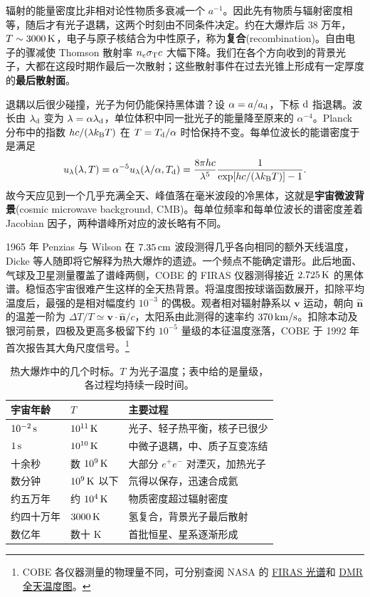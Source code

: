 辐射的能量密度比非相对论性物质多衰减一个 $a^{-1}$。因此先有物质与辐射密度相等，随后才有光子退耦，这两个时刻由不同条件决定。约在大爆炸后 $38$ 万年，$T\sim3000\,{\rm K}$，电子与原子核结合为中性原子，称为\textbf{复合}(recombination)。自由电子的骤减使 Thomson 散射率 $n_e\sigma_{\rm T}c$ 大幅下降。我们在各个方向收到的背景光子，大都在这段时期作最后一次散射；这些散射事件在过去光锥上形成有一定厚度的\textbf{最后散射面}。

退耦以后很少碰撞，光子为何仍能保持黑体谱？设 $\alpha=a/a_{\rm d}$，下标 $\rm d$ 指退耦。波长由 $\lambda_{\rm d}$ 变为 $\lambda=\alpha\lambda_{\rm d}$，单位体积中同一批光子的能量降至原来的 $\alpha^{-4}$。Planck 分布中的指数 $hc/(\lambda k_{\rm B}T)$ 在 $T=T_{\rm d}/\alpha$ 时恰保持不变。每单位波长的能谱密度于是满足
\[
   u_\lambda(\lambda,T)=\alpha^{-5}u_\lambda(\lambda/\alpha,T_{\rm d})
   =\frac{8\pi hc}{\lambda^5}\frac{1}{\exp[hc/(\lambda k_{\rm B}T)]-1}.
\]
故今天应见到一个几乎充满全天、峰值落在毫米波段的冷黑体，这就是\textbf{宇宙微波背景}(cosmic microwave background, CMB)。每单位频率和每单位波长的谱密度差着 Jacobian 因子，两种谱峰所对应的波长略有不同。

1965 年 Penzias 与 Wilson 在 $7.35\,{\rm cm}$ 波段测得几乎各向相同的额外天线温度，Dicke 等人随即将它解释为热大爆炸的遗迹。一个频点不能确定谱形。此后地面、气球及卫星测量覆盖了谱峰两侧，COBE 的 FIRAS 仪器测得接近 $2.725\,{\rm K}$ 的黑体谱。稳恒态宇宙很难产生这样的全天热背景。将温度图按球谐函数展开，扣除平均温度后，最强的是相对幅度约 $10^{-3}$ 的偶极。观者相对辐射静系以 $\bm v$ 运动，朝向 $\hat{\bm n}$ 的温差一阶为 $\Delta T/T\simeq\bm v\cdot\hat{\bm n}/c$，太阳系由此测得的速率约 $370\,{\rm km/s}$。扣除本动及银河前景，四极及更高多极留下约 $10^{-5}$ 量级的本征温度涨落，COBE 于 1992 年首次报告其大角尺度信号。\footnote{COBE 各仪器测量的物理量不同，可分别查阅 NASA 的 \href{https://lambda.gsfc.nasa.gov/product/cobe/about_firas.html}{FIRAS 光谱}和 \href{https://lambda.gsfc.nasa.gov/product/cobe/about_dmr.html}{DMR 全天温度图}。}

\begin{table}[htbp]
\centering\small
\caption{热大爆炸中的几个时标。$T$ 为光子温度；表中给的是量级，各过程均持续一段时间。}\label{tab:cosmo-thermal}
\begin{tabular}{@{}lll@{}}\toprule
宇宙年龄 & $T$ & 主要过程 \\ \midrule
$10^{-2}\,{\rm s}$ & $10^{11}\,{\rm K}$ & 光子、轻子热平衡，核子已很少 \\
$1\,{\rm s}$ & $10^{10}\,{\rm K}$ & 中微子退耦，中、质子互变冻结 \\
十余秒 & 数 $10^9\,{\rm K}$ & 大部分 $e^+e^-$ 对湮灭，加热光子 \\
数分钟 & $10^9\,{\rm K}$ 以下 & 氘得以保存，迅速合成氦 \\
约五万年 & 约 $10^4\,{\rm K}$ & 物质密度超过辐射密度 \\
约四十万年 & $3000\,{\rm K}$ & 氢复合，背景光子最后散射 \\
数亿年 & 数十 K & 首批恒星、星系逐渐形成 \\ \bottomrule
\end{tabular}
\end{table}

